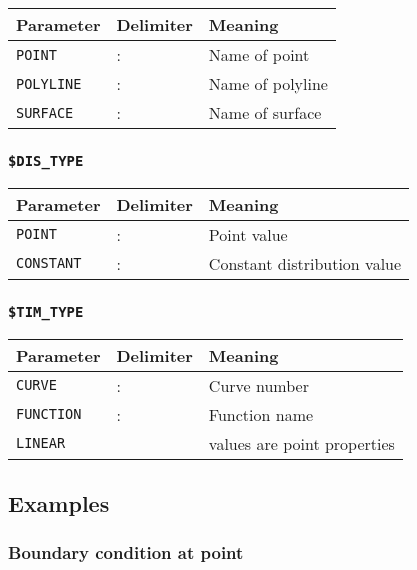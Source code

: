 \begin{tabular*}{12.773cm}{|p{}|p{1.5cm}|p{7cm}|} \hline
Parameter          & Delimiter & Meaning \\ \hline \hline
%
\texttt{POINT}    & : & Name of point \\
\texttt{POLYLINE} & : & Name of polyline \\
\texttt{SURFACE}  & : & Name of surface \\
\hline
\end{tabular*}

\subsubsection{\texttt{\$DIS\_TYPE}}

\begin{tabular*}{12.773cm}{|p{}|p{1.5cm}|p{7cm}|} \hline
Parameter          & Delimiter & Meaning \\ \hline \hline
%
\texttt{POINT}    & : & Point value \\
\texttt{CONSTANT} & : & Constant distribution value \\
\hline
\end{tabular*}

\subsubsection{\texttt{\$TIM\_TYPE}}

\begin{tabular*}{12.773cm}{|p{}|p{1.5cm}|p{7cm}|} \hline
Parameter          & Delimiter & Meaning \\ \hline \hline
%
\texttt{CURVE}    & : & Curve number \\
\texttt{FUNCTION} & : & Function name \\
\texttt{LINEAR  } &   & values are point properties \\
\hline
\end{tabular*}

\subsection{Examples}

\subsubsection{Boundary condition at point}

